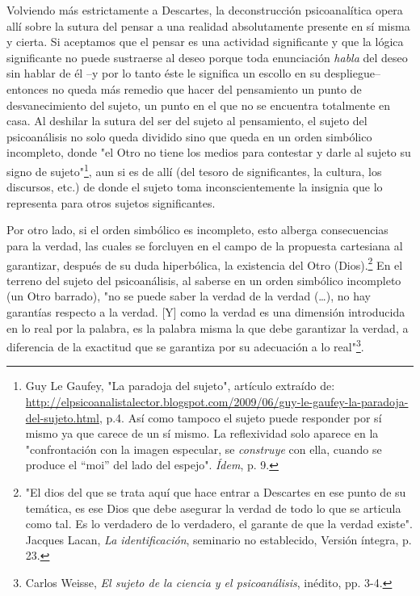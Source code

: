 Volviendo más estrictamente a Descartes, la deconstrucción
psicoanalítica opera allí sobre la sutura del pensar a una realidad
absolutamente presente en sí misma y cierta. Si aceptamos que el pensar
es una actividad significante y que la lógica significante no puede
sustraerse al deseo porque toda enunciación \emph{habla} del deseo sin
hablar de él --y por lo tanto éste le significa un escollo en su
despliegue-- entonces no queda más remedio que hacer del pensamiento un
punto de desvanecimiento del sujeto, un punto en el que no se encuentra
totalmente en casa. Al deshilar la sutura del ser del sujeto al
pensamiento, el sujeto del psicoanálisis no solo queda dividido sino que
queda en un orden simbólico incompleto, donde "el Otro no tiene los
medios para contestar y darle al sujeto su signo de sujeto"\footnote{Guy
  Le Gaufey, "La paradoja del sujeto", artículo extraído de:
  \url{http://elpsicoanalistalector.blogspot.com/2009/06/guy-le-gaufey-la-paradoja-del-sujeto.html},
  p.4. Así como tampoco el sujeto puede responder por sí mismo ya que
  carece de un sí mismo. La reflexividad solo aparece en la
  "confrontación con la imagen especular, se \emph{construye} con ella,
  cuando se produce el ``moi'' del lado del espejo". \emph{Ídem}, p. 9.},
aun si es de allí (del tesoro de significantes, la cultura, los
discursos, etc.) de donde el sujeto toma inconscientemente la insignia
que lo representa para otros sujetos significantes.

Por otro lado, si el orden simbólico es incompleto, esto alberga
consecuencias para la verdad, las cuales se forcluyen en el campo de la
propuesta cartesiana al garantizar, después de su duda hiperbólica, la
existencia del Otro (Dios).\footnote{"El dios del que se trata aquí que
  hace entrar a Descartes en ese punto de su temática, es ese Dios que
  debe asegurar la verdad de todo lo que se articula como tal. Es lo
  verdadero de lo verdadero, el garante de que la verdad existe".
  Jacques Lacan, \emph{La identificación}, seminario no establecido,
  Versión íntegra, p. 23.} En el terreno del sujeto del psicoanálisis,
al saberse en un orden simbólico incompleto (un Otro barrado), "no se
puede saber la verdad de la verdad (\ldots), no hay garantías respecto a
la verdad. {[}Y{]} como la verdad es una dimensión introducida en lo
real por la palabra, es la palabra misma la que debe garantizar la
verdad, a diferencia de la exactitud que se garantiza por su adecuación
a lo real"\footnote{Carlos Weisse, \emph{El sujeto de la ciencia y el
  psicoanálisis}, inédito, pp. 3-4.}.

